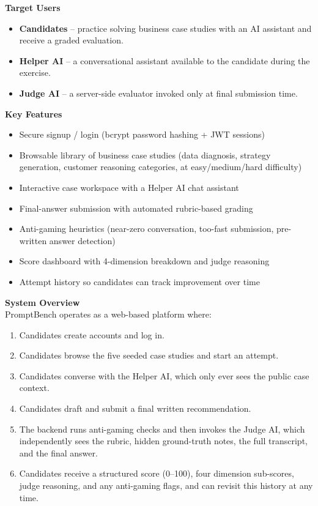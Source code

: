 \documentclass[12pt,a4paper]{report}
\begin{document}
\textbf{Target Users}
\begin{itemize}[nosep]
    \item \textbf{Candidates} -- practice solving business case studies with an AI assistant and
    receive a graded evaluation.
    \item \textbf{Helper AI} -- a conversational assistant available to the candidate during the
    exercise.
    \item \textbf{Judge AI} -- a server-side evaluator invoked only at final submission time.
\end{itemize}

\textbf{Key Features}
\begin{itemize}[nosep]
    \item Secure signup / login (bcrypt password hashing + JWT sessions)
    \item Browsable library of business case studies (data diagnosis, strategy generation,
    customer reasoning categories, at easy/medium/hard difficulty)
    \item Interactive case workspace with a Helper AI chat assistant
    \item Final-answer submission with automated rubric-based grading
    \item Anti-gaming heuristics (near-zero conversation, too-fast submission, pre-written answer
    detection)
    \item Score dashboard with 4-dimension breakdown and judge reasoning
    \item Attempt history so candidates can track improvement over time
\end{itemize}

\textbf{System Overview}\\
PromptBench operates as a web-based platform where:
\begin{enumerate}[nosep]
    \item Candidates create accounts and log in.
    \item Candidates browse the five seeded case studies and start an attempt.
    \item Candidates converse with the Helper AI, which only ever sees the public case context.
    \item Candidates draft and submit a final written recommendation.
    \item The backend runs anti-gaming checks and then invokes the Judge AI, which independently
    sees the rubric, hidden ground-truth notes, the full transcript, and the final answer.
    \item Candidates receive a structured score (0--100), four dimension sub-scores, judge
    reasoning, and any anti-gaming flags, and can revisit this history at any time.
\end{enumerate}
\end{document}
